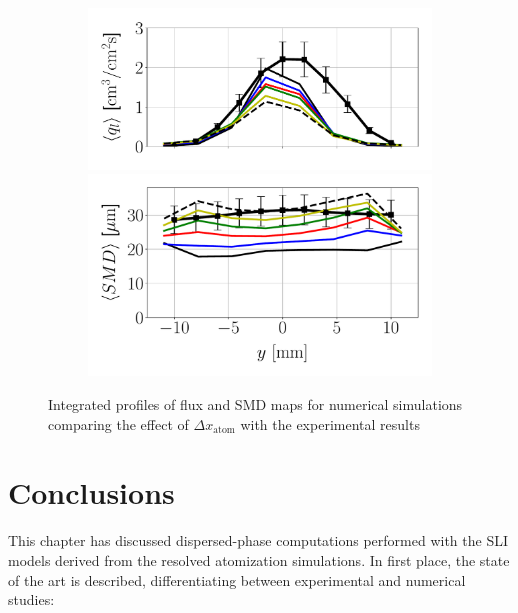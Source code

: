\begin{figure}[h!]
\begin{subfigure}[b]{0.4\textwidth}
	\flushleft
   \includegraphics[scale=0.35]{./part2_developments/figures_ch6_lagrangian_JICF/params_dx_atom/profiles/flux_along_y}\\
   \vspace{-0.16in}
   \includegraphics[scale=0.35]{./part2_developments/figures_ch6_lagrangian_JICF/params_dx_atom/profiles/SMD_along_y}
\end{subfigure}

\caption{Integrated profiles of flux and SMD maps for numerical simulations comparing the effect of $\Delta x_\mathrm{atom}$ with the experimental results}
\label{fig:profiles_LGS_JICF_dx_aom}
\end{figure}


\clearpage

\section{Conclusions}


This chapter has discussed dispersed-phase computations performed with the SLI models derived from the resolved atomization simulations. In first place, the state of the art is described, differentiating between experimental and numerical studies:

